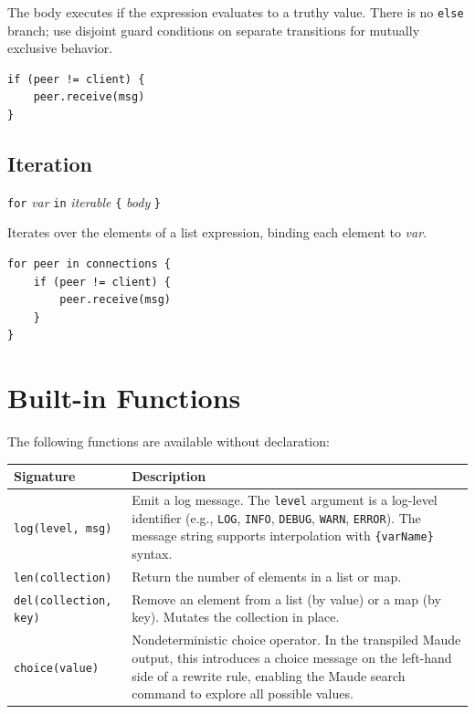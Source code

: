\documentclass[11pt,letterpaper]{article}
\begin{document}
The body executes if the expression evaluates to a truthy value.  There
is no \lstinline{else} branch; use disjoint guard conditions on
separate transitions for mutually exclusive behavior.

\begin{lstlisting}
if (peer != client) {
    peer.receive(msg)
}
\end{lstlisting}

\subsection{Iteration}

\begin{syntaxbox}[for]
\texttt{for} \textit{var} \texttt{in} \textit{iterable} \texttt{\{} \textit{body} \texttt{\}}
\end{syntaxbox}

Iterates over the elements of a list expression, binding each element to
\textit{var}.

\begin{lstlisting}
for peer in connections {
    if (peer != client) {
        peer.receive(msg)
    }
}
\end{lstlisting}


\section{Built-in Functions}
\label{sec:builtins}

The following functions are available without declaration:

\begin{longtable}{@{}p{4.6cm}p{8cm}@{}}
\toprule
\textbf{Signature} & \textbf{Description} \\
\midrule
\texttt{log(level, msg)} &
  Emit a log message.  The \texttt{level} argument is a log-level
  identifier (e.g., \texttt{LOG}, \texttt{INFO}, \texttt{DEBUG},
  \texttt{WARN}, \texttt{ERROR}).  The message string supports
  interpolation with \texttt{\{varName\}} syntax. \\
\addlinespace
\texttt{len(collection)} &
  Return the number of elements in a list or map. \\
\addlinespace
\texttt{del(collection, key)} &
  Remove an element from a list (by value) or a map (by key).
  Mutates the collection in place. \\
\addlinespace
\texttt{choice(value)} &
  Nondeterministic choice operator.  In the transpiled Maude output, this
  introduces a choice message on the left-hand side of a rewrite rule,
  enabling the Maude search command to explore all possible values. \\
\bottomrule
\end{longtable}
\end{document}
